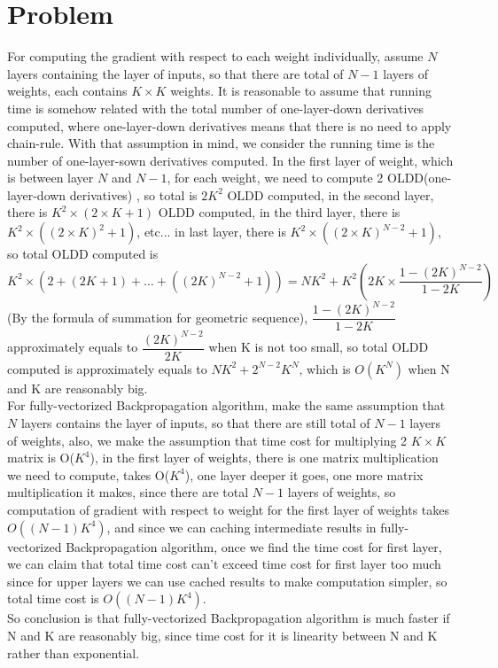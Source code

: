 \documentclass{article}
\newcommand{\enterProblemHeader}[1]{
}
\newcommand{\exitProblemHeader}[1]{
}
\newcounter{homeworkProblemCounter} %
\newcommand{\homeworkProblemName}{}
\newenvironment{homeworkProblem}[1][Problem \arabic{homeworkProblemCounter}]{ %
	\stepcounter{homeworkProblemCounter} %
	\renewcommand{\homeworkProblemName}{#1} %
	\section{\homeworkProblemName} %
	\enterProblemHeader{\homeworkProblemName} %
}{
	\exitProblemHeader{\homeworkProblemName} %
}
\begin{document}
	\begin{homeworkProblem}
		For computing the gradient with respect to each weight individually,  assume $N$ layers containing the layer of inputs, so that there are total of $N-1$ layers of weights, each contains $K \times K$ weights. It is reasonable to assume that running time is somehow related with the total number of one-layer-down derivatives computed, where one-layer-down derivatives means that there is no need to apply chain-rule. With that assumption in mind, we consider the running time is the number of one-layer-sown derivatives computed. In the first layer of weight, which is between layer $N$ and $N - 1$, for each weight, we need to compute 2 OLDD(one-layer-down derivatives) , so total is $2K^2$ OLDD computed, in the second layer, there is $K^2 \times (2 \times K + 1) $ OLDD computed, in the third layer, there is $K^2 \times ((2 \times K)^2 + 1) $, etc...
		in last layer, there is $K^2 \times ((2 \times K)^{N - 2} + 1) $, so total OLDD computed is $K^2 \times (2 + (2K + 1) + \dots + ((2K)^{N-2} + 1)) = NK^2 + K^2(2K \times \dfrac{1 - (2K)^{N - 2}}{1- 2K})$  (By the formula of summation for geometric sequence), $\dfrac{1 - (2K)^{N - 2}}{1- 2K}$ approximately equals to $\dfrac{(2K)^{N - 2}}{2K}$  when K is not too small, so total OLDD computed is 
		approximately equals to $NK^2 + 2^{N- 2}K^{N}$, which is $O(K^{N})$ when N and K are reasonably big.\\
		
		
		For fully-vectorized Backpropagation algorithm, make the same assumption that $N$ layers contains the layer of inputs, so that there are still total of $N - 1$ layers of weights, also, we make the assumption that time cost for multiplying 2 $K \times K$ matrix is O($K ^ 4$), in the first layer of weights, there is one matrix multiplication we need to compute, takes O($K ^ 4$), one layer deeper it goes, one more matrix multiplication it makes, since there are total $N - 1$ layers of weights, so computation of gradient with respect to weight for the first layer of weights takes $O((N-1)K^4)$, and since we can caching intermediate results in fully-vectorized Backpropagation algorithm, once we find the time cost for first layer, we can claim that total time cost can't exceed time cost for first layer too much since  for upper layers we can use cached results to make computation simpler, so total time cost is $O((N-1)K^4)$.\\
		
		So conclusion is that fully-vectorized Backpropagation algorithm is much faster if N and K are reasonably big, since time cost for it is linearity between N and K rather than exponential. 

	\end{homeworkProblem}
	\clearpage
\end{document}
